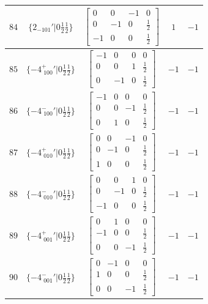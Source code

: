 \documentclass[fleqn,8pt]{jsarticle}
\begin{document}
\begin{longtable}{ccccc}
$ 84 $ & $ \{2{}_{-101}{}'|0 \frac{1}{2} \frac{1}{2}\} $ & $ \begin{bmatrix} 0 & 0 & -1 & 0 \\ 0 & -1 & 0 & \frac{1}{2} \\ -1 & 0 & 0 & \frac{1}{2} \end{bmatrix} $ & $ 1 $ & $ -1 $ \\ \hline
$ 85 $ & $ \{-4^{+}_{\,\,100}{}'|0 \frac{1}{2} \frac{1}{2}\} $ & $ \begin{bmatrix} -1 & 0 & 0 & 0 \\ 0 & 0 & 1 & \frac{1}{2} \\ 0 & -1 & 0 & \frac{1}{2} \end{bmatrix} $ & $ -1 $ & $ -1 $ \\ \hline
$ 86 $ & $ \{-4^{-}_{\,\,100}{}'|0 \frac{1}{2} \frac{1}{2}\} $ & $ \begin{bmatrix} -1 & 0 & 0 & 0 \\ 0 & 0 & -1 & \frac{1}{2} \\ 0 & 1 & 0 & \frac{1}{2} \end{bmatrix} $ & $ -1 $ & $ -1 $ \\ \hline
$ 87 $ & $ \{-4^{+}_{\,\,010}{}'|0 \frac{1}{2} \frac{1}{2}\} $ & $ \begin{bmatrix} 0 & 0 & -1 & 0 \\ 0 & -1 & 0 & \frac{1}{2} \\ 1 & 0 & 0 & \frac{1}{2} \end{bmatrix} $ & $ -1 $ & $ -1 $ \\ \hline
$ 88 $ & $ \{-4^{-}_{\,\,010}{}'|0 \frac{1}{2} \frac{1}{2}\} $ & $ \begin{bmatrix} 0 & 0 & 1 & 0 \\ 0 & -1 & 0 & \frac{1}{2} \\ -1 & 0 & 0 & \frac{1}{2} \end{bmatrix} $ & $ -1 $ & $ -1 $ \\ \hline
$ 89 $ & $ \{-4^{+}_{\,\,001}{}'|0 \frac{1}{2} \frac{1}{2}\} $ & $ \begin{bmatrix} 0 & 1 & 0 & 0 \\ -1 & 0 & 0 & \frac{1}{2} \\ 0 & 0 & -1 & \frac{1}{2} \end{bmatrix} $ & $ -1 $ & $ -1 $ \\ \hline
$ 90 $ & $ \{-4^{-}_{\,\,001}{}'|0 \frac{1}{2} \frac{1}{2}\} $ & $ \begin{bmatrix} 0 & -1 & 0 & 0 \\ 1 & 0 & 0 & \frac{1}{2} \\ 0 & 0 & -1 & \frac{1}{2} \end{bmatrix} $ & $ -1 $ & $ -1 $ \\ \hline

\end{longtable}
\end{document}
